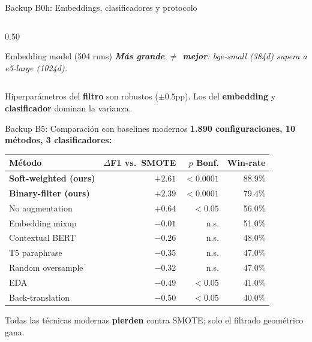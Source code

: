 \begin{frame}{Backup B0h: Embeddings, clasificadores y protocolo}
\begin{columns}[T]
\begin{column}{0.50\textwidth}
\begin{block}{Embedding model (504 runs)}
\vspace{0.2em}
{\itshape \textbf{Más grande $\neq$ mejor}: bge-small (384d) supera a e5-large (1024d).}
\end{block}
\end{column}

\end{columns}

\vspace{0.2em}
\begin{insight}
\scriptsize Hiperparámetros del \textbf{filtro} son robustos ($\pm 0.5$pp). Los del \textbf{embedding} y \textbf{clasificador} dominan la varianza.
\end{insight}
\end{frame}


\begin{frame}{Backup B5: Comparación con baselines modernos}
\small
\textbf{1.890 configuraciones, 10 métodos, 3 clasificadores:}

\vspace{0.5em}
\begin{tabular}{@{}lrrr@{}}
\toprule
Método                         & $\Delta$F1 vs.\ SMOTE & $p$ Bonf. & Win-rate \\
\midrule
\textbf{Soft-weighted (ours)}  & \alert{$+2{.}61$}     & $<0{.}0001$ & 88.9\% \\
\textbf{Binary-filter (ours)}  & $+2{.}39$             & $<0{.}0001$ & 79.4\% \\
No augmentation                & $+0{.}64$             & $<0{.}05$   & 56.0\% \\
Embedding mixup                & $-0{.}01$             & n.s.        & 51.0\% \\
Contextual BERT                & $-0{.}26$             & n.s.        & 48.0\% \\
T5 paraphrase                  & $-0{.}35$             & n.s.        & 47.0\% \\
Random oversample              & $-0{.}32$             & n.s.        & 47.0\% \\
EDA                            & $-0{.}49$             & $<0{.}05$   & 41.0\% \\
Back-translation               & $-0{.}50$             & $<0{.}05$   & 40.0\% \\
\bottomrule
\end{tabular}

\vspace{0.5em}
\begin{insight}
\scriptsize Todas las técnicas modernas \textbf{pierden} contra SMOTE; solo el filtrado geométrico gana.
\end{insight}
\end{frame}

